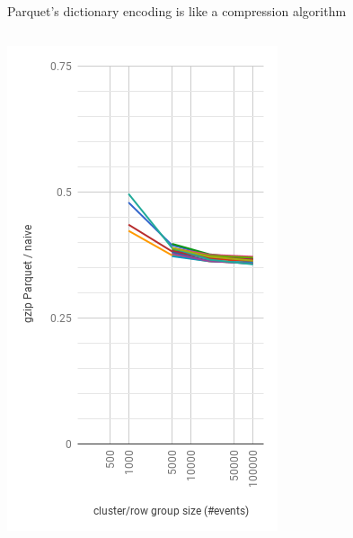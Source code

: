 \documentclass[aspectratio=169]{beamer}
\begin{document}
\begin{frame}{Parquet's dictionary encoding is like a compression algorithm}
\begin{columns}
\begin{center}
\includegraphics[width=\linewidth]{parquet-gzip-2.png}
\end{center}
\end{columns}
\end{frame}
\end{document}
